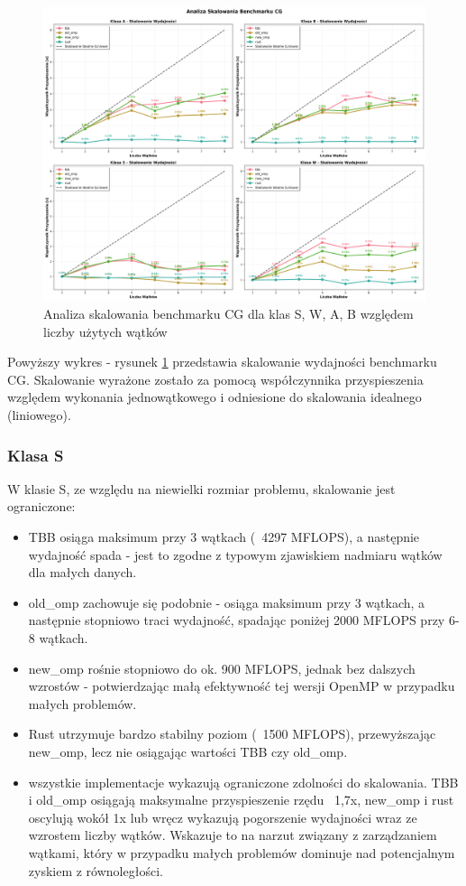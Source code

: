 \begin{figure}[H]
    \centering
    \includegraphics[width=\textwidth]{analiza/images/parallel/cg/cg_analiza_skalowania.png}
    \caption{Analiza skalowania benchmarku CG dla klas S, W, A, B względem liczby użytych wątków}
    \label{cg_analiza_skalowania}
\end{figure}
Powyższy wykres - rysunek \ref{cg_analiza_skalowania} przedstawia skalowanie wydajności benchmarku CG. Skalowanie wyrażone zostało za pomocą współczynnika przyspieszenia względem wykonania jednowątkowego i odniesione do skalowania idealnego (liniowego).

\subsubsection{Klasa S}
W klasie S, ze względu na niewielki rozmiar problemu, skalowanie jest ograniczone:
\begin{itemize}
    \item TBB osiąga maksimum przy 3 wątkach (~4297 MFLOPS), a następnie wydajność spada - jest to zgodne z typowym zjawiskiem nadmiaru wątków dla małych danych.
    \item old\_omp zachowuje się podobnie - osiąga maksimum przy 3 wątkach, a następnie stopniowo traci wydajność, spadając poniżej 2000 MFLOPS przy 6-8 wątkach.
    \item new\_omp rośnie stopniowo do ok. 900 MFLOPS, jednak bez dalszych wzrostów - potwierdzając małą efektywność tej wersji OpenMP w przypadku małych problemów.
    \item Rust utrzymuje bardzo stabilny poziom (~1500 MFLOPS), przewyższając new\_omp, lecz nie osiągając wartości TBB czy old\_omp.
    \item wszystkie implementacje wykazują ograniczone zdolności do skalowania. TBB i old\_omp osiągają maksymalne przyspieszenie rzędu ~1,7x, new\_omp i rust oscylują wokół 1x lub wręcz wykazują pogorszenie wydajności wraz ze wzrostem liczby wątków. Wskazuje to na narzut związany z zarządzaniem wątkami, który w przypadku małych problemów dominuje nad potencjalnym zyskiem z równoległości.
\end{itemize}

